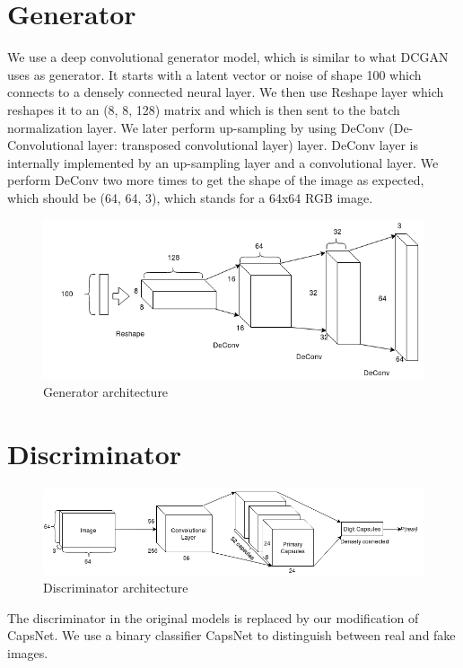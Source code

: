 \section{Generator} %
\label{sec:generator}
We use a deep convolutional generator model, which is similar to what DCGAN uses as generator. It starts with a latent vector or noise of shape 100 which connects to a densely connected neural layer. We then use Reshape layer which reshapes it to an (8, 8, 128) matrix and which is then sent to the batch normalization layer. We later perform up-sampling by using DeConv (De-Convolutional layer: transposed convolutional layer) layer. DeConv layer is internally implemented by an up-sampling layer and a convolutional layer. We perform DeConv two more times to get the shape of the image as expected, which should be (64, 64, 3), which stands for a 64x64 RGB image.
\begin{figure}[H]
\centering\includegraphics[width=1\textwidth]{images/Generator.png}
\caption{Generator architecture}
\label{fig:generator}
\end{figure} 



\section{Discriminator} %
\label{sec:discriminator}
\begin{figure}[H]
\centering\includegraphics[width=1\textwidth]{images/Discriminator.png}
\caption{Discriminator architecture}
\label{fig:discriminator}
\end{figure} 
The discriminator in the original models is replaced by our modification of CapsNet. We use a binary classifier CapsNet to distinguish between real and fake images. 

